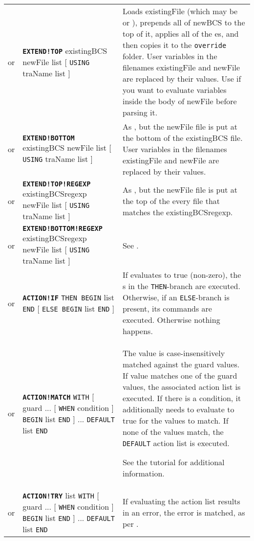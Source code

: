 \documentclass{article}
\def\ttref#1{\ahrefloc{#1}{\tt #1}}
\def\DEFINE#1{{\tt \bf #1}\label{#1}\index{#1}}
\def\DEFSYN#1{{\tt \bf #1}\index{#1}}
\def\t#1{{\tt #1}}
\def\Slist{{\color{red} list }}
\def\Ob{{\color{red} [ }}
\def\Oe{{\color{red} ] }}
\begin{document}
\begin{tabular}{cp{10in}|p{10in}}
  or & \DEFSYN{EXTEND!TOP} existingBCS newFile \ttref{patch} \Slist \Ob \t{USING} traName \Slist \Oe &
    Loads existingFile (which may be \ttref{BAF} or \ttref{BCS}), prepends
    all of newBCS to the top of it, applies all of the \ttref{patch}es, and
    then copies it to the \t{override} folder. User variables in
    the filenames existingFile and newFile are replaced by their values.
    Use \ttref{EVALUATE!BUFFER} if you want to evaluate variables inside
    the body of newFile before parsing it. \\
  or & \DEFSYN{EXTEND!BOTTOM} existingBCS newFile \ttref{patch} \Slist \Ob \t{USING} traName \Slist \Oe &
    As \ttref{EXTEND!TOP}, but the newFile file is put at the bottom of the
    existingBCS file. User variables in the filenames existingFile and
    newFile are replaced by their values. \\
  or & \DEFINE{EXTEND!TOP!REGEXP} existingBCSregexp newFile \ttref{patch} \Slist \Ob \t{USING} traName \Slist \Oe &
    As \ttref{EXTEND!TOP}, but the newFile file is put at the top of the
    every \ttref{BCS} file that matches the \ttref{regexp}
    existingBCSregexp. \\
  or & \DEFINE{EXTEND!BOTTOM!REGEXP} existingBCSregexp newFile \ttref{patch} \Slist \Ob \t{USING} traName \Slist \Oe &
    See \ttref{EXTEND!TOP!REGEXP}.  \\
  or & \DEFINE{ACTION!IF} \ttref{value} \t{THEN BEGIN}
    \ttref{TP2 Action} \Slist \t{END}
    \Ob \t{ELSE BEGIN} \ttref{TP2 Action} \Slist \t{END} \Oe &
    If \ttref{value} evaluates to true (non-zero), the \ttref{TP2 Action}s
    in the \t{THEN}-branch are executed. Otherwise, if an \t{ELSE}-branch
    is present, its commands are executed. Otherwise nothing happens. \\
  or & \DEFINE{ACTION!MATCH} \ttref{value} \t{WITH} \Ob guard\ttref{value} ...
    \Ob \t{WHEN} condition\ttref{value} \Oe
    \t{BEGIN} \ttref{TP2 Action} \Slist \t{END} \Oe ...
    \t{DEFAULT} \ttref{TP2 Action} \Slist \t{END} &
    The value is case-insensitively matched against the guard
    values. If value matches one of the guard values, the associated
    action list is executed. If there is a condition, it additionally
    needs to evaluate to true for the values to match. If none
    of the values match, the \t{DEFAULT} action list is executed.

    See the \ttref{MATCH and TRY} tutorial for additional information.
  \\
  or & \DEFINE{ACTION!TRY} \ttref{TP2 Action} \Slist \t{WITH} \Ob guard\ttref{value} ...
    \Ob \t{WHEN} condition\ttref{value} \Oe
    \t{BEGIN} \ttref{TP2 Action} \Slist \t{END} \Oe ...
    \t{DEFAULT} \ttref{TP2 Action} \Slist \t{END} &
    If evaluating the action list results in an error, the error is matched, as per \ttref{ACTION!MATCH}.


\end{tabular}
\end{document}
